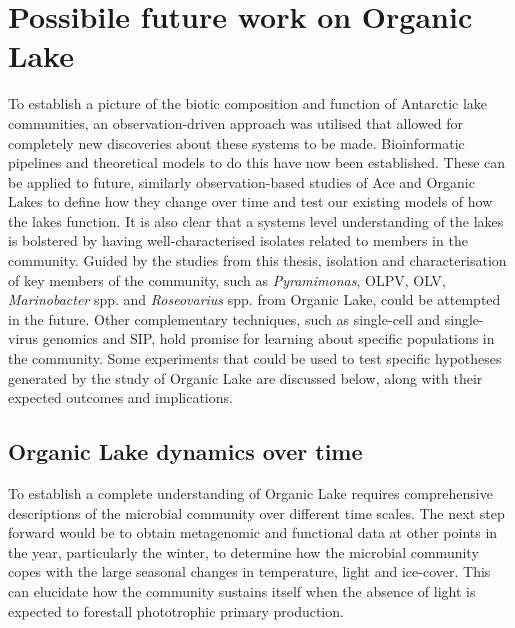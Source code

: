 \section{Possibile future work on Organic Lake}
To establish a picture of the biotic composition and function of Antarctic lake communities, an observation-driven approach was utilised that allowed for completely new discoveries about these systems to be made.
Bioinformatic pipelines and theoretical models to do this have now been established.
These can be applied to future, similarly observation-based studies of Ace and Organic Lakes to define how they change over time and test our existing models of how the lakes function.
It is also clear that a systems level understanding of the lakes is bolstered by having well-characterised isolates related to members in the community.
Guided by the studies from this thesis, isolation and characterisation of key members of the community, such as \emph{Pyramimonas}, \ac{OLPV}, \ac{OLV}, \emph{Marinobacter} spp. and \emph{Roseovarius} spp. from Organic Lake, could be attempted in the future.
Other complementary techniques, such as single-cell and single-virus genomics and \ac{SIP}, hold promise for learning about specific populations in the community.
Some experiments that could be used to test specific hypotheses generated by the study of Organic Lake are discussed below, along with their expected outcomes and implications.

\subsection{Organic Lake dynamics over time}
To establish a complete understanding of Organic Lake requires comprehensive descriptions of the microbial community over different time scales.
The next step forward would be to obtain metagenomic and functional data at other points in the year, particularly the winter, to determine how the microbial community copes with the large seasonal changes in temperature, light and ice-cover.
This can elucidate how the community sustains itself when the absence of light is expected to forestall phototrophic primary production.


